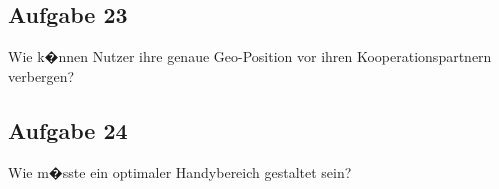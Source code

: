 \subsection*{Aufgabe 23}
Wie k�nnen Nutzer ihre genaue Geo-Position vor ihren Kooperationspartnern verbergen?

\subsection*{Aufgabe 24} 
Wie m�sste ein optimaler Handybereich gestaltet sein?



%



\cleardoublepage 
{}
{}


\cleardoublepage
